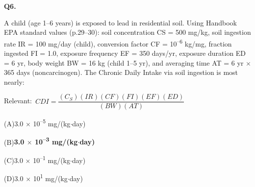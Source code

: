 \documentclass[11pt]{article}
\newcommand{\correct}[1]{\textbf{#1}\;{\color{accent}$\checkmark$}}
\newcommand{\optline}[2]{\par\noindent\hspace{1.2em}(#1)\hspace{0.6em}#2}
\begin{document}
\filbreak
\textbf{\color{accent}Q6.}\par\vspace{2pt}
A child (age 1--6 years) is exposed to lead in residential soil. Using Handbook EPA standard values (p.29--30): soil concentration CS = 500 mg/kg, soil ingestion rate IR = 100 mg/day (child), conversion factor CF = 10\textsuperscript{--}\textsuperscript{6} kg/mg, fraction ingested FI = 1.0, exposure frequency EF = 350 days/yr, exposure duration ED = 6 yr, body weight BW = 16 kg (child 1--5 yr), and averaging time AT = 6 yr $\times$ 365 days (noncarcinogen). The Chronic Daily Intake via soil ingestion is most nearly:\par\vspace{3pt}
{\small\color{soft}Relevant:}\ $CDI = \dfrac{(C_S)(IR)(CF)(FI)(EF)(ED)}{(BW)(AT)}$\par\vspace{3pt}
\optline{A}{3.0 $\times$ 10\textsuperscript{--}\textsuperscript{5} mg/(kg$\cdot$day)}
\optline{B}{\correct{3.0 $\times$ 10\textsuperscript{--}\textsuperscript{3} mg/(kg$\cdot$day)}}
\optline{C}{3.0 $\times$ 10\textsuperscript{--}\textsuperscript{1} mg/(kg$\cdot$day)}
\optline{D}{3.0 $\times$ 10\textsuperscript{1} mg/(kg$\cdot$day)}
\par\vspace{3pt}
\end{document}

